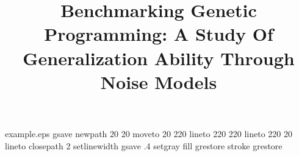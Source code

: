 

%
%
%
%
%
\begin{filecontents*}{example.eps}
gsave
newpath
  20 20 moveto
  20 220 lineto
  220 220 lineto
  220 20 lineto
closepath
2 setlinewidth
gsave
  .4 setgray fill
grestore
stroke
grestore
\end{filecontents*}
%
\RequirePackage{fix-cm}
%
\documentclass[smallextended]{svjour3}       %
%
\smartqed  %
%
\usepackage{graphicx}
\usepackage{lscape}

%
%
%
%
%


\title{Benchmarking Genetic Programming: A Study Of Generalization Ability Through Noise Models
}


